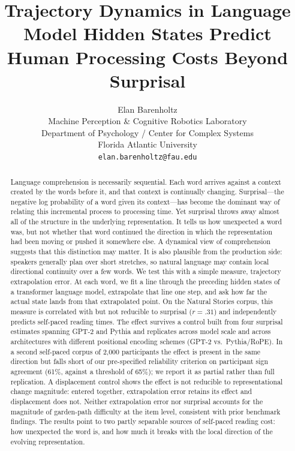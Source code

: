 \documentclass[12pt]{article}
\title{Trajectory Dynamics in Language Model Hidden States Predict Human Processing Costs Beyond Surprisal}
\author{Elan Barenholtz\\
Machine Perception \& Cognitive Robotics Laboratory\\
Department of Psychology / Center for Complex Systems\\
Florida Atlantic University\\
\texttt{elan.barenholtz@fau.edu}}
\date{}
\newcommand{\new}[1]{#1}   %
\begin{document}
\maketitle

\begin{abstract}
Language comprehension is necessarily sequential. Each word arrives against a context created by the words before it, and that context is continually changing. Surprisal---the negative log probability of a word given its context---has become the dominant way of relating this incremental process to processing time. Yet surprisal throws away almost all of the structure in the underlying representation. It tells us how unexpected a word was, but not whether that word continued the direction in which the representation had been moving or pushed it somewhere else. A dynamical view of comprehension suggests that this distinction may matter. It is also plausible from the production side: speakers generally plan over short stretches, so natural language may contain local directional continuity over a few words. We test this with a simple measure, trajectory extrapolation error. At each word, we fit a line through the preceding hidden states of a transformer language model, extrapolate that line one step, and ask how far the actual state lands from that extrapolated point. On the Natural Stories corpus, this measure is \new{correlated with but not reducible to} surprisal (\new{$r = .31$}) and independently predicts self-paced reading times. The effect \new{survives a control built from four surprisal estimates spanning GPT-2 and Pythia and replicates across model scale and} across architectures with different positional encoding schemes (GPT-2 vs.\ Pythia/RoPE). \new{In a second self-paced corpus of 2,000 participants the effect is present in the same direction but falls short of our pre-specified reliability criterion on participant sign agreement (61\%, against a threshold of 65\%); we report it as partial rather than full replication.} A displacement control shows the effect is not reducible to representational change magnitude\new{: entered together, extrapolation error retains its effect and displacement does not}. \new{Neither extrapolation error nor surprisal accounts for the magnitude of garden-path difficulty at the item level, consistent with prior benchmark findings.} The results point to two partly separable sources of \new{self-paced reading} cost: how unexpected the word is, and how much it breaks with the local direction of the evolving representation.

\end{abstract}
\end{document}
